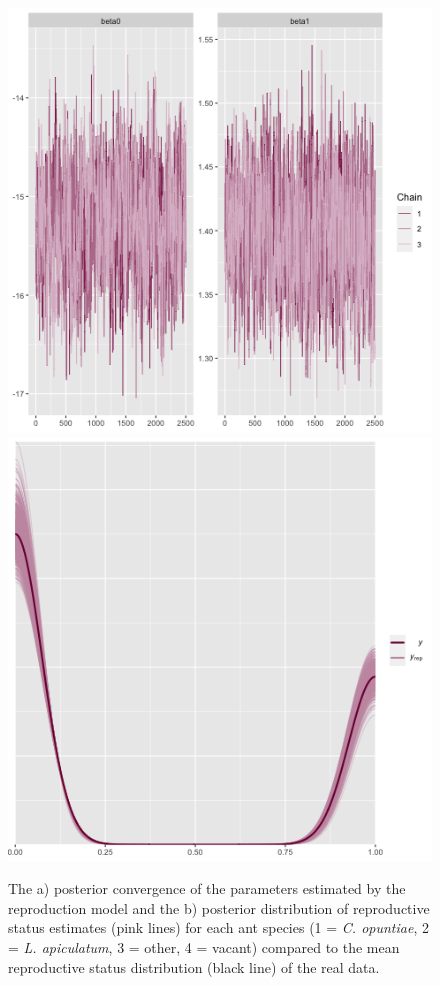 \documentclass[11pt]{article}
\begin{document}
\begin{figure}
	\includegraphics[width = 0.45\linewidth]{Figures/repro_conv.png}
	\includegraphics[width=0.45\linewidth]{Figures/repro_post.png}
	\caption{The a) posterior convergence of the parameters estimated by the reproduction model and the b) posterior distribution of reproductive status estimates (pink lines) for each ant species (1 = \textit{C. opuntiae}, 2 = \textit{L. apiculatum}, 3 = other, 4 = vacant) compared to the mean reproductive status distribution (black line) of the real data.}
	\label{fig:Repro_post}
\end{figure}
\end{document}
